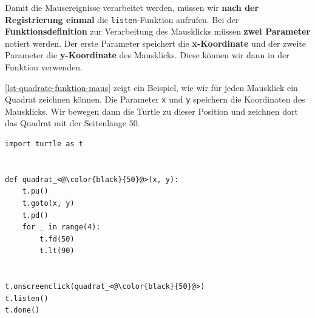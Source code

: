 Damit die Mausereignisse verarbeitet werden, müssen wir \textbf{nach der Registrierung einmal} die \lstinline[language={python3}]{listen}-Funktion aufrufen. Bei der \textbf{Funktionsdefinition} zur Verarbeitung des Mausklicks müssen \textbf{zwei Parameter} notiert werden. Der erste Parameter speichert die \textbf{x-Koordinate} und der zweite Parameter die \textbf{y-Koordinate} des Mausklicks. Diese können wir dann in der Funktion verwenden.

\begin{example}
\autoref{lst-quadrate-funktion-maus} zeigt ein Beispiel, wie wir für jeden Mausklick ein Quadrat zeichnen können. Die Parameter \lstinline[language={python3}]{x} und \lstinline[language={python3}]{y} speichern die Koordinaten des Mausklicks. Wir bewegen dann die Turtle zu dieser Position und zeichnen dort das Quadrat mit der Seitenlänge $50$.

\begin{lstlisting}[language={python3}, caption={Bei jedem Mausklick wird die Funktion einmal ausgeführt. (\graybgtexttt{quadrate.py}).}, label={lst-quadrate-funktion-maus}]
import turtle as t


def quadrat_<@\color{black}{50}@>(x, y):
	t.pu()
	t.goto(x, y)
	t.pd()
	for _ in range(4):
		t.fd(50)
		t.lt(90)


t.onscreenclick(quadrat_<@\color{black}{50}@>)
t.listen()
t.done()
\end{lstlisting}
\end{example}

\vfill

